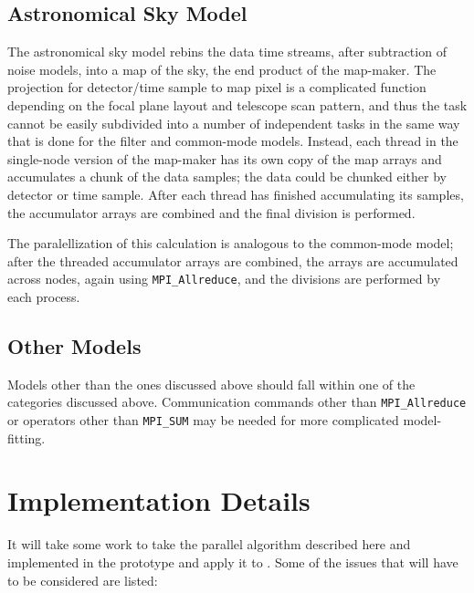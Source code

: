 \documentclass[oneside,11pt]{starlink}
\begin{document}
\subsection{Astronomical Sky Model}

The astronomical sky model rebins the data time streams, after
subtraction of noise models, into a map of the sky, the end product of
the map-maker. The projection for detector/time sample to map pixel is
a complicated function depending on the focal plane layout and
telescope scan pattern, and thus the task cannot be easily subdivided
into a number of independent tasks in the same way that is done for
the filter and common-mode models. Instead, each thread in the
single-node version of the map-maker has its own copy of the map
arrays and accumulates a chunk of the data samples; the data could be
chunked either by detector or time sample. After each thread has
finished accumulating its samples, the accumulator arrays are combined
and the final division is performed.

The paralellization of this calculation is analogous to the
common-mode model; after the threaded accumulator arrays are combined,
the arrays are accumulated across nodes, again using
\verb+MPI_Allreduce+, and the divisions are performed by each process.

\subsection{Other Models}

Models other than the ones discussed above should fall within one of
the categories discussed above. Communication commands other than
\verb+MPI_Allreduce+ or operators other than \verb+MPI_SUM+ may be
needed for more complicated model-fitting.

\section{Implementation
  Details\label{se:implementation}}

It will take some work to take the parallel algorithm described here
and implemented in the prototype and apply it to \makemap. Some of the
issues that will have to be considered are listed:
\end{document}
